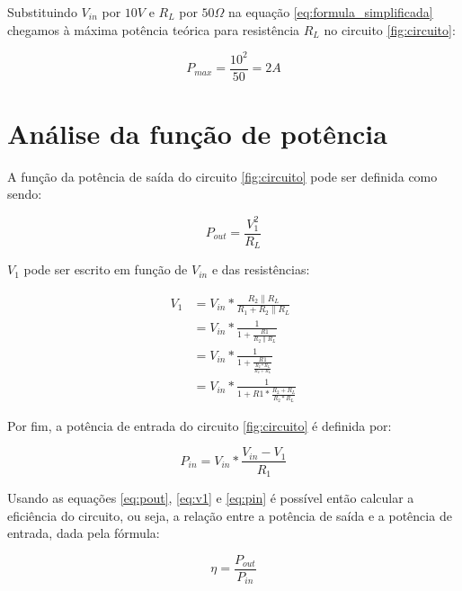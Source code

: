 \documentclass[12pt]{article}
\begin{document}
Substituindo $V_{in}$ por $10V$ e $R_L$ por $50\Omega$ na equação \ref{eq:formula_simplificada} chegamos à máxima potência teórica para  resistência $R_L$ no circuito \ref{fig:circuito}:

\begin{equation}
    \label{eq:potencia_teorica}
    P_{max} = \frac{10^2}{50} = 2A
\end{equation}


\section{Análise da função de potência}

A função da potência de saída do circuito \ref{fig:circuito} pode ser definida como sendo:

\begin{equation}
    \label{eq:pout}
    P_{out} = \frac{V_1^2}{R_L}
\end{equation}

$V_1$ pode ser escrito em função de $V_{in}$ e das resistências:

\begin{equation}
    \label{eq:v1}
    \begin{split}
        V_1 & = V_{in} * \frac{R_2\parallel R_L}{R_1 + R_2\parallel R_L} \\
        & = V_{in} * \frac{1}{1 + \frac{R1}{R_2\parallel R_L}} \\
        & = V_{in} * \frac{1}{1 + \frac{R1}{\frac{R_2 * R_L}{R_2 + R_L} }} \\
        & = V_{in} * \frac{1}{1 + R1 * \frac{R_2 + R_L}{R_2 * R_L} }
    \end{split}
\end{equation}

Por fim, a potência de entrada do circuito \ref{fig:circuito} é definida por:

\begin{equation}
    \label{eq:pin}
    P_{in} = V_{in} * \frac{V_{in} - V_1}{R_1}
\end{equation}

Usando as equações \ref{eq:pout}, \ref{eq:v1} e \ref{eq:pin} é possível então calcular a eficiência do circuito, ou seja, a relação entre a potência de saída e a potência de entrada, dada pela fórmula:

\begin{equation}
    \label{eq:n}
    \eta = \frac{P_{out}}{P_{in}}
\end{equation}
\end{document}
